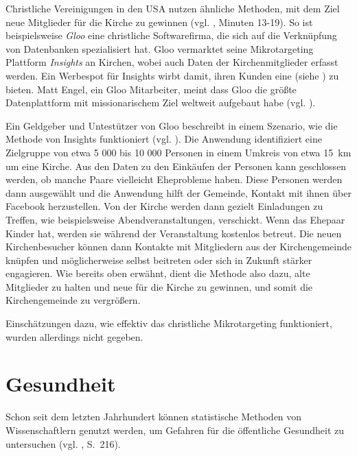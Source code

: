 Christliche Vereinigungen in den USA nutzen ähnliche Methoden, mit dem Ziel neue Mitglieder für die Kirche
zu gewinnen (vgl. \cite{Viken}, Minuten 13-19). So ist beispielsweise \emph{Gloo} eine christliche Softwarefirma,
die sich auf die Verknüpfung von Datenbanken spezialisiert hat. Gloo vermarktet seine Mikrotargeting Plattform
\emph{Insights} an Kirchen, wobei auch Daten der Kirchenmitglieder erfasst werden. Ein Werbespot für Insights
wirbt damit, ihren Kunden eine \grqq{} (siehe \cite{Viken}) zu bieten. Matt Engel, ein Gloo
Mitarbeiter, meint dass Gloo die größte Datenplattform mit missionarischem Ziel weltweit aufgebaut habe (vgl. \cite{Viken}).

Ein Geldgeber und Untestützer von Gloo beschreibt in einem Szenario, wie die Methode von Insights funktioniert (vgl. \cite{Viken}).
Die Anwendung identifiziert eine Zielgruppe von etwa 5 000 bis 10 000 Personen in einem Umkreis von etwa 15~km um eine Kirche.
Aus den Daten zu den Einkäufen der Personen kann geschlossen werden, ob manche Paare vielleicht Eheprobleme haben.
Diese Personen werden dann ausgewählt und die Anwendung hilft der Gemeinde, Kontakt mit ihnen über Facebook herzustellen.
Von der Kirche werden dann gezielt Einladungen zu Treffen, wie beispielsweise Abendveranstaltungen, verschickt. Wenn das Ehepaar
Kinder hat, werden sie während der Veranstaltung kostenlos betreut. Die neuen Kirchenbesucher können dann Kontakte mit
Mitgliedern aus der Kirchengemeinde knüpfen und möglicherweise selbst beitreten oder sich in Zukunft stärker engagieren.
Wie bereits oben erwähnt, dient die Methode also dazu, alte Mitglieder zu halten und neue für die Kirche zu gewinnen,
und somit die Kirchengemeinde zu vergrößern.

Einschätzungen dazu, wie effektiv das christliche Mikrotargeting funktioniert, wurden allerdings nicht gegeben.

\section{Gesundheit}



Schon seit dem letzten Jahrhundert können statistische Methoden von Wissenschaftlern
genutzt werden, um Gefahren für die öffentliche Gesundheit zu untersuchen (vgl. \cite{Proctor}, S.~216).

